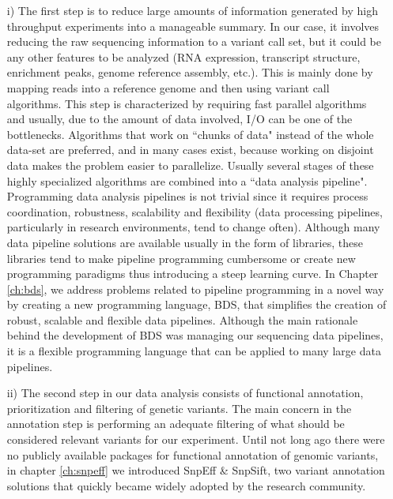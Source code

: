 \begin{itemize}
\item[i)] The first step is to reduce large amounts of information generated by high throughput experiments into a manageable summary. 
In our case, it involves reducing the raw sequencing information to a variant call set, but it could be any other features to be analyzed (RNA expression, transcript structure, enrichment peaks, genome reference assembly, etc.). 
This is mainly done by mapping reads into a reference genome and then using variant call algorithms. 
This step is characterized by requiring fast parallel algorithms and usually, due to the amount of data involved, I/O can be one of the bottlenecks. Algorithms that work on ``chunks of data" instead of the whole data-set are preferred, and in many cases exist, because working on disjoint data makes the problem easier to parallelize. 
Usually several stages of these highly specialized algorithms are combined into a ``data analysis pipeline". 
Programming data analysis pipelines is not trivial since it requires process coordination, robustness, scalability and flexibility (data processing pipelines, particularly in research environments, tend to change often). 
Although many data pipeline solutions are available usually in the form of libraries, these libraries tend to make pipeline programming cumbersome or create new programming paradigms thus introducing a steep learning curve. 
In Chapter \ref{ch:bds}, we address problems related to pipeline programming in a novel way by creating a new programming language, BDS, that simplifies the creation of robust, scalable and flexible data pipelines. 
Although the main rationale behind the development of BDS was managing our sequencing data pipelines, it is a flexible programming language that can be applied to many large data pipelines.

\item[ii)] The second step in our data analysis consists of functional annotation, prioritization and filtering of genetic variants. 
The main concern in the annotation step is performing an adequate filtering of what should be considered relevant variants for our experiment. 
Until not long ago there were no publicly available packages for functional annotation of genomic variants, in chapter \ref{ch:snpeff} we introduced SnpEff \& SnpSift, two variant annotation solutions that quickly became widely adopted by the research community. 


\end{itemize}
